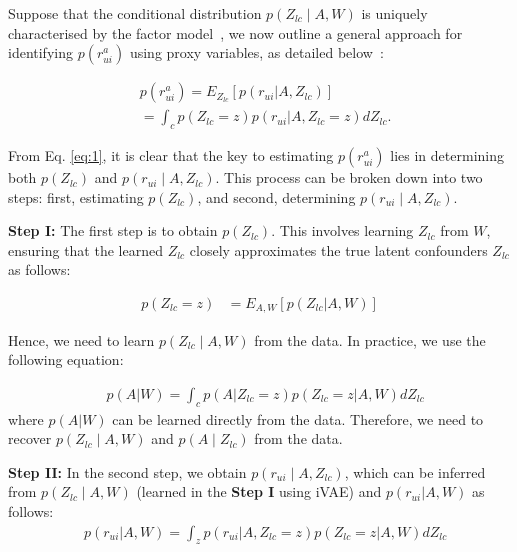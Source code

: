 \documentclass[sigconf]{acmart}
\begin{document}
Suppose that the conditional distribution $p({Z_{lc}} \mid {A}, {W})$ is uniquely characterised by the factor model~\cite{10.5555/120565.120567}, we now outline a general approach for identifying $p(r_{ui}^a)$ using proxy variables, as detailed below~\cite{20}:

\begin{equation}
\label{eq:1}
\begin{split}
&p(r_{u i}^a) 
= E_{{Z_{lc}}}[p(r_{u i} | {A}, {Z_{lc}})] 
\\&= \int_c p({Z_{lc}} = z) p(r_{u i} | {A}, {Z_{lc}} = z) dZ_{lc}.
\end{split}
\end{equation}


From Eq. \ref{eq:1}, it is clear that the key to estimating \( p(r_{ui}^a) \) lies in determining both \( p({Z_{lc}}) \) and \( p(r_{ui} \mid {A}, {Z_{lc}}) \). 
This process can be broken down into two steps: first, estimating \( p({Z_{lc}}) \), and second, determining \( p(r_{ui} \mid {A}, {Z_{lc}}) \).
 


\textbf{Step I:}
The first step is to obtain \( p({Z_{lc}}) \). 
This involves learning \( {Z_{lc}} \) from  \( {W} \), ensuring that the learned \( {Z_{lc}} \) closely approximates the true latent confounders \( {Z_{lc}} \) \cite{9,17} as follows:


\begin{equation}
\begin{split}
p({Z_{lc}} = z) &= E_{{A}, {W}}[p({Z_{lc}} | {A}, {W})]
\end{split}
\end{equation}

Hence, we need to learn $p\left({Z_{lc}} \mid {A}, {W}\right)$ from the data. In practice, we use the following equation:

\begin{equation}
\label{eq:3}
\begin{split}
&p({A} | {W}) = \int_c p({A} | {Z_{lc}} = z) p({Z_{lc}} = z | {A}, {W}) d Z_{lc}
\end{split}
\end{equation}
where $p({A} | {W})$ can be learned directly from the data. Therefore, we need to recover $p\left({Z_{lc}} \mid {A}, {W}\right)$ and $p\left({A} \mid {Z_{lc}}\right)$ from the data. 


\textbf{Step II:}
In the second step, we obtain $p\left(r_{u i} \mid {A}, {Z_{lc}}\right)$, which can be inferred from $p\left({Z_{lc}} \mid {A}, {W}\right)$ (learned in the \textbf{Step I} using iVAE) and $p(r_{u i} | {A}, W)$ as follows: 
\begin{equation}
\begin{split}
&p(r_{u i} | {A}, {W}) = \int_z p(r_{u i} | {A}, {Z_{lc}} = z) p({Z_{lc}} = z | {A}, {W}) d Z_{lc}
\end{split}
\end{equation}
\end{document}
